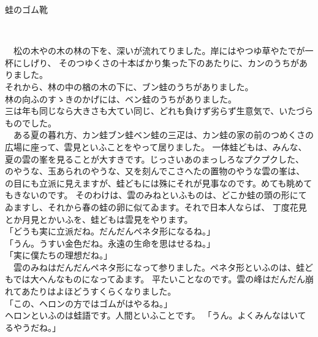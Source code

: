 \documentclass[
a4paper,
book]
{tarticle}
\begin{document}
\fontsize{16pt}{30pt}\selectfont
\rubysetup{(-)} %
\mcfamily %

蛙のゴム靴\\
\begin{flushright}
\\
\end{flushright}
\newpage %


　松の木やの木の林の下を、深いが流れてりました。岸にはやつゆ草やたでが一杯にしげり、
そのつゆくさの十本ばかり集った下のあたりに、カンのうちがありました。\\
それから、林の中の楢の木の下に、ブン蛙のうちがありました。\\
林の向ふのすゝきのかげには、ベン蛙のうちがありました。\\
三は年も同じなら大きさも大てい同じ、どれも負けず劣らず生意気で、いたづらものでした。\\
　ある夏の暮れ方、カン蛙ブン蛙ベン蛙の三疋は、カン蛙の家の前のつめくさの広場に座って、雲見といふことをやって居りました。
一体蛙どもは、みんな、夏の雲の峯を見ることが大すきです。じっさいあのまっしろなプクプクした、
のやうな、玉あられのやうな、又を刻んでこさへたの置物のやうな雲の峯は、
の目にも立派に見えますが、蛙どもには殊にそれが見事なのです。めても眺めてもきないのです。
そのわけは、雲のみねといふものは、どこか蛙の頭の形にてゐますし、それから春の蛙の卵に似てゐます。それで日本人ならば、
丁度花見とか月見とかいふを、蛙どもは雲見をやります。\\
「どうも実に立派だね。だんだんペネタ形になるね。」\\
「うん。うすい金色だね。永遠の生命を思はせるね。」\\
「実に僕たちの理想だね。」\\
　雲のみねはだんだんペネタ形になって参りました。ペネタ形といふのは、蛙どもでは大へんなものになってゐます。
平たいことなのです。雲の峰はだんだん崩れてあたりはよほどうすくらくなりました。\\
「この、ヘロンの方ではゴムがはやるね。」\\
ヘロンといふのは蛙語です。人間といふことです。
「うん。よくみんなはいてるやうだね。」\\
\end{document}
